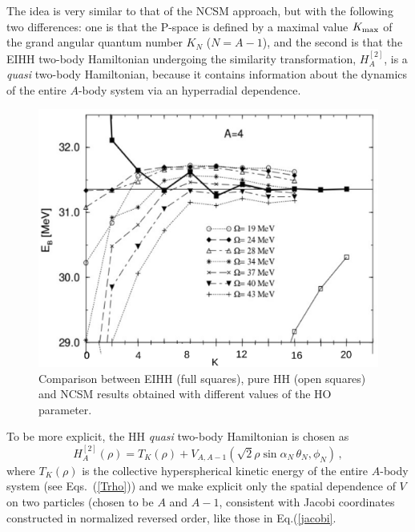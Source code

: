 The idea is very similar to that of the NCSM approach, but with the following two differences:
one is that the P-space is defined by a maximal value $K_{\rm max}$ of the 
grand angular quantum number $K_N$ ($N=A-1$), and the second is that 
the EIHH two-body Hamiltonian  undergoing the similarity transformation, $H_A^{[2]}$, is a {\it quasi} 
two-body Hamiltonian, because it  contains information about the dynamics of the entire $A$-body system via an hyperradial dependence. 
\begin{figure}
\sidecaption
\includegraphics[scale=.35]{Chapter7-figures/fig2.eps}
%
%
\caption{Comparison between EIHH (full squares), pure HH 
(open squares)  and NCSM results obtained with different values of the HO
parameter.}
\label{fig:2}       %
\end{figure}

To be more explicit, the HH {\it quasi} two-body Hamiltonian is chosen as  
\begin{equation}
\label{H_quasi}
 H^{[2]}_A(\rho)= T_K(\rho) + V_{A,A-1}(\sqrt{2}\rho \sin{\alpha_N} \, \theta_N,\phi_N)\,,
\end{equation} 
where $T_K(\rho)$ is the collective hyperspherical kinetic energy of the entire $A$-body system 
(see Eqs.~(\ref{Trho})) and we make explicit only the spatial dependence of $V$ on two particles 
(chosen to be $A$ and $A-1$, consistent with  Jacobi coordinates constructed  in normalized reversed order, like those
in Eq.(\ref{jacobi}. 

